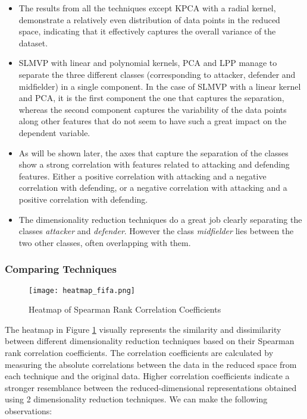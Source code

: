 \begin{itemize}
    \item The results from all the techniques except KPCA with a radial kernel, demonstrate a relatively even distribution of data points in the reduced space, indicating that it effectively captures the overall variance of the dataset.
    \item SLMVP with linear and polynomial kernels, PCA and LPP manage to separate the three different classes (corresponding to attacker, defender and midfielder) in a single component. In the case of SLMVP with a linear kernel and PCA, it is the first component the one that captures the separation, whereas the second component captures the variability of the data points along other features that do not seem to have such a great impact on the dependent variable.
    \item As will be shown later, the axes that capture the separation of the classes show a strong correlation with features related to attacking and defending features. Either a positive correlation with attacking and a negative correlation with defending, or a negative correlation with attacking and a positive correlation with defending.
    \item The dimensionality reduction techniques do a great job clearly separating the classes \textit{attacker} and \textit{defender}. However the class \textit{midfielder} lies between the two other classes, often overlapping with them.
\end{itemize}

\subsubsection{Comparing Techniques}

\begin{figure}[!ht]
    \centering
    \texttt{[image: heatmap\_fifa.png]}
    \caption{Heatmap of Spearman Rank Correlation Coefficients}
    \label{fig:heatmap-fifa}
\end{figure}

The heatmap in Figure \ref{fig:heatmap-fifa} visually represents the similarity and dissimilarity between different dimensionality reduction techniques based on their Spearman rank correlation coefficients. The correlation coefficients are calculated by measuring the absolute correlations between the data in the reduced space from each technique and the original data. Higher correlation coefficients indicate a stronger resemblance between the reduced-dimensional representations obtained using 2 dimensionality reduction techniques. We can make the following observations:

